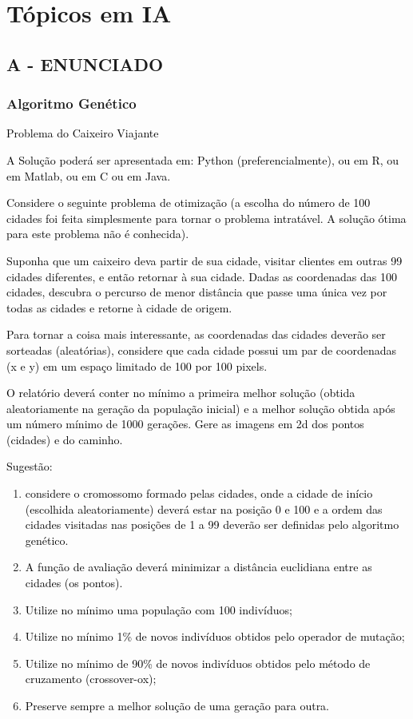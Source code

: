 \label{ap:ap15}
\chapter{Tópicos em IA}
\section*{\textbf{A - ENUNCIADO}}

\subsection{Algoritmo Genético}


\textcolor{black}{Problema do Caixeiro Viajante}


\textcolor{black}{A Solução poderá ser apresentada em: Python (preferencialmente), ou em R, ou em Matlab, ou em C ou em
Java.}


\textcolor{black}{Considere o seguinte problema de otimização (a escolha do número de 100 cidades foi feita simplesmente
para tornar o problema intratável. A solução ótima para este problema não é conhecida).}


\textcolor{black}{Suponha que um caixeiro deva partir de sua cidade, visitar clientes em outras 99 cidades diferentes, e
então retornar à sua cidade. Dadas as coordenadas das 100 cidades, descubra o percurso de menor distância que passe uma
única vez por todas as cidades e retorne à cidade de origem.}


\textcolor{black}{Para tornar a coisa mais interessante, as coordenadas das cidades deverão ser sorteadas (aleatórias),
considere que cada cidade possui um par de coordenadas (x e y) em um espaço limitado de 100 por 100 pixels.}


\textcolor{black}{O relatório deverá conter no mínimo a primeira melhor solução (obtida aleatoriamente na geração da
população inicial) e a melhor solução obtida após um número mínimo de 1000 gerações. Gere as imagens em 2d dos pontos
(cidades) e do caminho.}


\textcolor{black}{Sugestão: }
\begin{enumerate}[series=listWWNumxxiii,label=(\arabic*),ref=\arabic*]
\item \textcolor{black}{considere o cromossomo formado pelas cidades, onde a cidade de início (escolhida aleatoriamente)
deverá estar na posição 0 e 100 e a ordem das cidades visitadas nas posições de 1 a 99 deverão ser definidas pelo
algoritmo genético.}
\item \textcolor{black}{A função de avaliação deverá minimizar a distância euclidiana entre as cidades (os pontos).}
\item \textcolor{black}{Utilize no mínimo uma população com 100 indivíduos;}
\item \textcolor{black}{Utilize no mínimo 1\% de novos indivíduos obtidos pelo operador de mutação;}
\item \textcolor{black}{Utilize no mínimo de 90\% de novos indivíduos obtidos pelo método de cruzamento (crossover-ox);}
\item \textcolor{black}{Preserve sempre a melhor solução de uma geração para outra.}
\end{enumerate}

